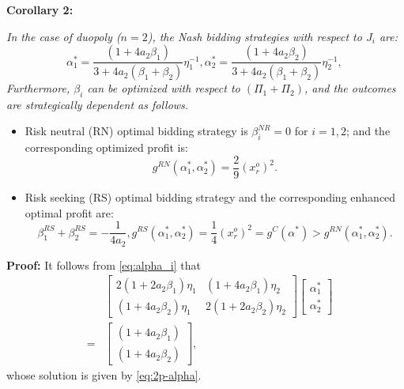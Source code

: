 \documentclass[journal]{IEEEtran}
\begin{document}
\noindent  \textbf{Corollary 2:} {\it In the case of duopoly ($n=2$), the Nash bidding strategies with respect to $J_i$ are:
\begin{subequations}
\label{eq:2p-alpha}
\begin{equation}
\alpha_1^*= \frac{(1+4a_2\beta_1)}{3+4a_2(\beta_1+\beta_2)}\eta_1^{-1}, 
\label{eq:2p-alpha1}
\end{equation} 
\begin{equation}
 \alpha_2^*= \frac{(1+4a_2\beta_2)}{3+4a_2(\beta_1+\beta_2)}\eta_2^{-1}, \, 
\label{eq:2p-alpha2}
\end{equation} 
\end{subequations}
Furthermore, $\beta_i$ can be optimized with respect to $(\Pi_1+\Pi_2)$, and the outcomes are strategically dependent as follows. 
\begin{itemize}
\item Risk neutral (RN) optimal bidding strategy is $\beta_i^{NR}=0$ for $i=1,2$; and the corresponding optimized profit is:
\begin{equation}
g^{RN}(\alpha_1^*, \alpha_2^*)  =  \frac{2}{9}(x_r^o)^2. 
\label{eq:2p-neutral}
\end{equation} 
\item Risk seeking (RS) optimal bidding strategy  and the corresponding enhanced optimal profit are:
\begin{subequations}
\label{eq:2p-RS}
\begin{equation}
\beta_1^{RS}+\beta_2^{RS}=-\frac{1}{4a_2},
\label{eq:2p-RS-beta}
\end{equation} 
\begin{equation}
g^{RS}(\alpha_1^*,\alpha_2^*) = \frac{1}{4}(x_r^o)^2 = g^C(\alpha^*)   > g^{RN}(\alpha_1^*, \alpha_2^*). 
\label{eq:2p-RS-g}
\end{equation} 
\end{subequations}
\end{itemize} }

 \noindent \textbf{Proof:} It follows from \eqref{eq:alpha_i} that 
 \begin{eqnarray*}
  && \begin{bmatrix} 2(1+2a_2 \beta_1)\eta_1 & (1+4a_2\beta_1)\eta_2  \\ (1+4a_2\beta_2)\eta_1  & 2(1+2a_2 \beta_2)\eta_2  \end{bmatrix}   
  \begin{bmatrix}  \alpha_1^* \\ \alpha_2^* \end{bmatrix}  \\
  & = &  \begin{bmatrix}  (1+4a_2\beta_1) \\ (1+4a_2\beta_2)\end{bmatrix},
      \end{eqnarray*}
 whose solution is given by \eqref{eq:2p-alpha}.
\end{document}
